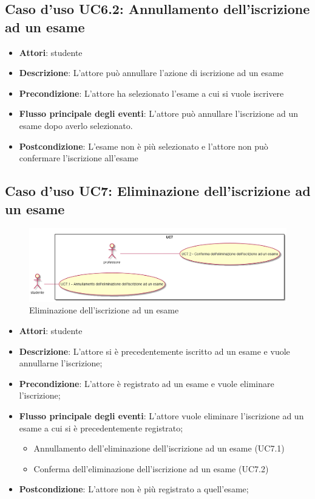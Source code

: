 \subsection{Caso d'uso \texorpdfstring{UC6.2}{UC6.2}: Annullamento dell'iscrizione ad un esame}
\begin{itemize}
\item \textbf{Attori}: studente
\item \textbf{Descrizione}: L'attore può annullare l'azione di iscrizione ad un esame
\item \textbf{Precondizione}: L'attore ha selezionato l'esame a cui si vuole iscrivere
\item \textbf{Flusso principale degli eventi}: L'attore può annullare l'iscrizione ad un esame dopo averlo selezionato.
\item \textbf{Postcondizione}: L'esame non è più selezionato e l'attore non può confermare l'iscrizione all'esame
\end{itemize}
\subsection{Caso d'uso \texorpdfstring{UC7}{UC7}: Eliminazione dell'iscrizione ad un esame}
\begin{figure} [H]
\centering
\includegraphics[scale=0.45]{./img/UC7.png}
\caption{Eliminazione dell'iscrizione ad un esame}\label{}
\end{figure}
\begin{itemize}
\item \textbf{Attori}: studente
\item \textbf{Descrizione}: L'attore si è precedentemente iscritto ad un esame e vuole annullarne l'iscrizione;
\item \textbf{Precondizione}: L'attore è registrato ad un esame e vuole eliminare l'iscrizione;
\item \textbf{Flusso principale degli eventi}: L'attore vuole eliminare l'iscrizione ad un esame a cui si è precedentemente registrato;
\begin{itemize}
\item Annullamento dell'eliminazione dell'iscrizione ad un esame (UC7.1)
\item Conferma dell'eliminazione dell'iscrizione ad un esame (UC7.2)
\end{itemize}
\item \textbf{Postcondizione}: L'attore non è più registrato a quell'esame;
\end{itemize}
